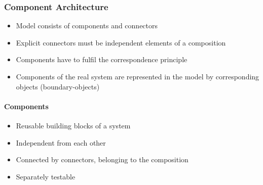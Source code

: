 \begin{paracol}{2}
    \subsubsection{Component Architecture}
    \begin{itemize}
        \item Model consists of components and connectors
        \item Explicit connectors must be independent elements of a composition
        \item Components have to fulfil the correspondence principle
        \item Components of the real system are represented in the model by corresponding objects (boundary-objects)
    \end{itemize}

    \paragraph{Components}
    \begin{itemize}
        \item Reusable building blocks of a system
        \item Independent from each other
        \item Connected by connectors, belonging to the composition
        \item Separately testable
    \end{itemize}

    \switchcolumn
\end{paracol}


